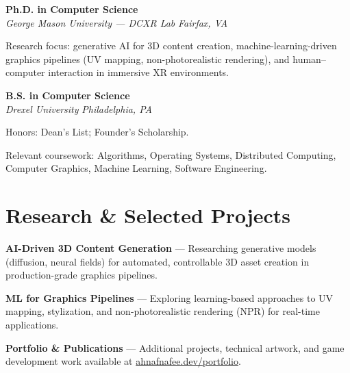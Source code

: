 \documentclass[letterpaper,10pt]{article}
\newcommand{\education}[4]{%
  \textbf{#1} \hfill \textit{#3}\\[-1pt]
  \textit{#2} \hfill \textit{#4}\par\vspace{2pt}
}
\begin{document}
\education{Ph.D. in Computer Science}{George Mason University --- DCXR Lab}{}{Fairfax, VA} %
\begin{tightitemize}
  \item Research focus: generative AI for 3D content creation, machine-learning-driven graphics pipelines (UV mapping, non-photorealistic rendering), and human--computer interaction in immersive XR environments.
\end{tightitemize}

\education{B.S. in Computer Science}{Drexel University}{}{Philadelphia, PA} %
\begin{tightitemize}
  \item Honors: Dean's List; Founder's Scholarship.
  \item Relevant coursework: Algorithms, Operating Systems, Distributed Computing, Computer Graphics, Machine Learning, Software Engineering.
\end{tightitemize}

\section*{Research \& Selected Projects}
\begin{tightitemize}
  \item \textbf{AI-Driven 3D Content Generation} --- Researching generative models (diffusion, neural fields) for automated, controllable 3D asset creation in production-grade graphics pipelines.
  \item \textbf{ML for Graphics Pipelines} --- Exploring learning-based approaches to UV mapping, stylization, and non-photorealistic rendering (NPR) for real-time applications.
  \item \textbf{Portfolio \& Publications} --- Additional projects, technical artwork, and game development work available at \href{https://www.ahnafnafee.dev/portfolio}{ahnafnafee.dev/portfolio}.
\end{tightitemize}
\end{document}
